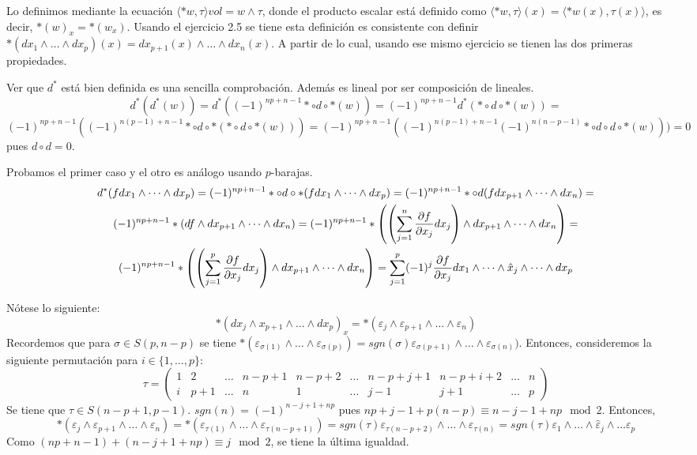\documentclass[twoside]{article}
\begin{document}
\begin{solucion}
Lo definimos mediante la ecuación $\langle *w,\tau\rangle vol =w\land\tau$, donde el producto escalar está definido como $\langle *w,\tau\rangle(x)=\langle *w(x), \tau(x)\rangle$, es decir, $*(w)_x=*(w_x)$. Usando el ejercicio 2.5 se tiene esta definición es consistente con definir $*(dx_1\land\dots\land dx_p)(x)=dx_{p+1}(x)\land\dots\land dx_n(x)$. A partir de lo cual, usando ese mismo ejercicio se tienen las dos primeras propiedades.

Ver que $d^*$ está bien definida es una sencilla comprobación. Además es lineal por ser composición de lineales.
\[
d^*(d^*(w))=d^*((-1)^{np+n-1}*\circ d\circ *(w))=(-1)^{np+n-1}d^*(*\circ d\circ *(w))=
\]
\[
(-1)^{np+n-1}((-1)^{n(p-1)+n-1}*\circ d\circ *(*\circ d\circ *(w)))=(-1)^{np+n-1}((-1)^{n(p-1)+n-1}(-1)^{n(n-p-1)}*\circ d\circ d\circ *(w)))=0
\]
pues $d\circ d=0$.

Probamos el primer caso y el otro es análogo usando $p$-barajas.
\begin{gather*}
d^*(fdx_1\land\dots\land dx_p)=(-1)^{np+n-1}*\circ d\circ *(fdx_1\land\dots\land dx_p)=(-1)^{np+n-1}*\circ d( f dx_{p+1}\land\dots\land dx_n)=\\
(-1)^{np+n-1}*(d f\land dx_{p+1}\land\dots\land dx_n)=(-1)^{np+n-1}*\left(\left(\sum_{j=1}^n\frac{\partial f}{\partial x_j}dx_j\right)\land dx_{p+1}\land\dots\land dx_n\right)=\\
(-1)^{np+n-1}*\left(\left(\sum_{j=1}^p\frac{\partial f}{\partial x_j}dx_j\right)\land dx_{p+1}\land\dots\land dx_n\right)=\sum_{j=1}^p(-1)^j\frac{\partial f}{\partial x_j}dx_1\land\dots\land\hat{x}_j\land\dots\land dx_p
\end{gather*}

Nótese lo siguiente:
\[
*(dx_j\land x_{p+1}\land\dots\land dx_p)_x=*(\varepsilon_j\land\varepsilon_{p+1}\land\dots\land\varepsilon_n)
\]
Recordemos que para $\sigma\in S(p,n-p)$ se tiene $*(\varepsilon_{\sigma(1)}\land\dots\land\varepsilon_{\sigma(p)})=sgn(\sigma)\varepsilon_{\sigma(p+1)}\land\dots\land\varepsilon_{\sigma(n)})$. Entonces, consideremos la siguiente permutación para $i\in\{1,\dots, p\}$:
\[
\tau=\begin{pmatrix}
1 & 2 & \dots &   n-p+1 & n-p+2& \dots & n-p+j+1 &n-p+i+2 & \dots & n\\
i & p+1 & \dots & n      & 1   & \dots & j-1     & j+1    &\dots & p
\end{pmatrix}
\]
Se tiene que $\tau\in S(n-p+1,p-1)$. $sgn(n)=(-1)^{n-j+1+np}$ pues $np+j-1+p(n-p)\equiv n-j-1+np\mod 2$.  Entonces,
\[
*(\varepsilon_j\land\varepsilon_{p+1}\land\dots\land\varepsilon_n)=*(\varepsilon_{\tau(1)}\land\dots\land\varepsilon_{\tau(n-p+1)})=sgn(\tau)\varepsilon_{\tau(n-p+2)}\land\dots\land\varepsilon_{\tau(n)}=sgn(\tau)\varepsilon_1\land\dots\land\hat{\varepsilon}_j\land\dots\varepsilon_p
\]
Como $(np+n-1)+(n-j+1+np)\equiv j\mod 2$, se tiene la última igualdad.


\end{solucion}
\end{document}
